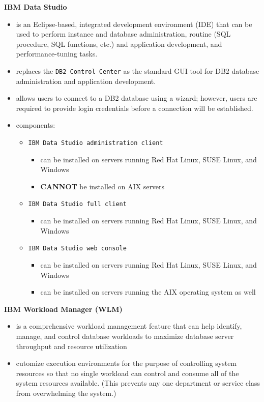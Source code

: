 \documentclass{article}
\begin{document}
\textbf{IBM Data Studio}
\begin{itemize}
\item is an Eclipse-based, integrated development environment (IDE) that can be used to perform
instance and database administration, routine (SQL procedure, SQL functions, etc.) and application
development, and performance-tuning tasks.
\item replaces the \texttt{DB2 Control Center} as the standard GUI tool for DB2 database administration
and application development.
\item allows users to connect to a DB2 database using a wizard; however, users are required to provide
login credentials before a connection will be established.
\item components:
\begin{itemize}
\item \texttt{IBM Data Studio administration client}
\begin{itemize}
\item can be installed on servers running Red Hat Linux, SUSE Linux, and Windows
\item \textbf{CANNOT} be installed on AIX servers
\end{itemize}
\item \texttt{IBM Data Studio full client}
\begin{itemize}
\item can be installed on servers running Red Hat Linux, SUSE Linux, and Windows
\end{itemize}
\item \texttt{IBM Data Studio web console}
\begin{itemize}
\item can be installed on servers running Red Hat Linux, SUSE Linux, and Windows
\item can be installed on servers running the AIX operating system as well
\end{itemize}
\end{itemize}
\end{itemize}

\textbf{IBM Workload Manager (WLM)}
\begin{itemize}
\item is a comprehensive workload management feature that can help identify, manage, and control
database workloads to maximize database server throughput and resource utilization
\item cutomize execution environments for the purpose of  controlling system resources so that
no single workload can control and consume all of the system resources available. 
(This prevents any one department or service class from overwhelming the system.)
\end{itemize}
\end{document}
